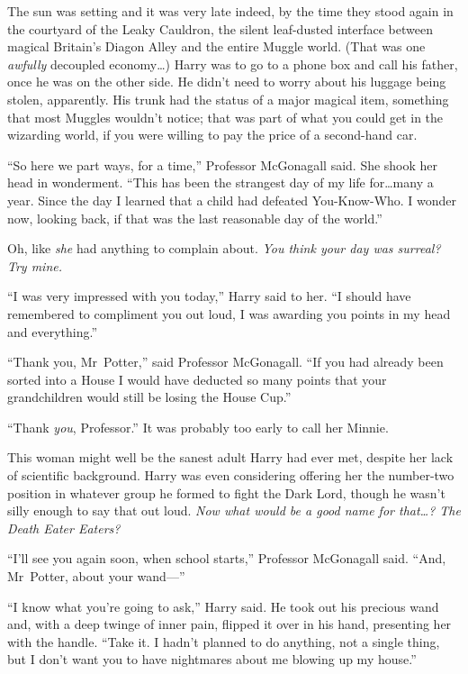 \later

The sun was setting and it was very late indeed, by the time they stood again in the courtyard of the Leaky Cauldron, the silent leaf-dusted interface between magical Britain’s Diagon Alley and the entire Muggle world. (That was one \emph{awfully} decoupled economy…) Harry was to go to a phone box and call his father, once he was on the other side. He didn’t need to worry about his luggage being stolen, apparently. His trunk had the status of a major magical item, something that most Muggles wouldn’t notice; that was part of what you could get in the wizarding world, if you were willing to pay the price of a second-hand car.

“So here we part ways, for a time,” Professor McGonagall said. She shook her head in wonderment. “This has been the strangest day of my life for…many a year. Since the day I learned that a child had defeated You-Know-Who. I wonder now, looking back, if that was the last reasonable day of the world.”

Oh, like \emph{she} had anything to complain about. \emph{You think your day was surreal? Try mine.}

“I was very impressed with you today,” Harry said to her. “I should have remembered to compliment you out loud, I was awarding you points in my head and everything.”

“Thank you, Mr~Potter,” said Professor McGonagall. “If you had already been sorted into a House I would have deducted so many points that your grandchildren would still be losing the House Cup.”

“Thank \emph{you}, Professor.” It was probably too early to call her Minnie.

This woman might well be the sanest adult Harry had ever met, despite her lack of scientific background. Harry was even considering offering her the number-two position in whatever group he formed to fight the Dark Lord, though he wasn’t silly enough to say that out loud. \emph{Now what would be a good name for that…? The Death Eater Eaters?}

“I’ll see you again soon, when school starts,” Professor McGonagall said. “And, Mr~Potter, about your wand—”

“I know what you’re going to ask,” Harry said. He took out his precious wand and, with a deep twinge of inner pain, flipped it over in his hand, presenting her with the handle. “Take it. I hadn’t planned to do anything, not a single thing, but I don’t want you to have nightmares about me blowing up my house.”

